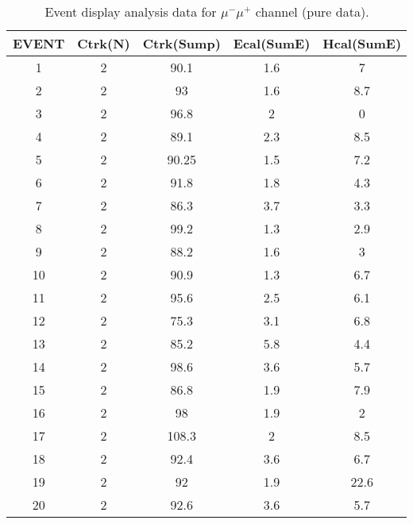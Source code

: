 \begin{table}[h!]
    \centering
    \caption{Event display analysis data for $\mu^-\mu^+$ channel (pure data).}
    \begin{tabular}{ccccc}
    \hline
    EVENT & Ctrk(N) & Ctrk(Sump) & Ecal(SumE) & Hcal(SumE) \\ \hline
    1     & 2       & 90.1       & 1.6        & 7          \\
    2     & 2       & 93         & 1.6        & 8.7        \\
    3     & 2       & 96.8       & 2          & 0          \\
    4     & 2       & 89.1       & 2.3        & 8.5        \\
    5     & 2       & 90.25      & 1.5        & 7.2        \\
    6     & 2       & 91.8       & 1.8        & 4.3        \\
    7     & 2       & 86.3       & 3.7        & 3.3        \\
    8     & 2       & 99.2       & 1.3        & 2.9        \\
    9     & 2       & 88.2       & 1.6        & 3          \\
    10    & 2       & 90.9       & 1.3        & 6.7        \\
    11    & 2       & 95.6       & 2.5        & 6.1        \\
    12    & 2       & 75.3       & 3.1        & 6.8        \\
    13    & 2       & 85.2       & 5.8        & 4.4        \\
    14    & 2       & 98.6       & 3.6        & 5.7        \\
    15    & 2       & 86.8       & 1.9        & 7.9        \\
    16    & 2       & 98         & 1.9        & 2          \\
    17    & 2       & 108.3      & 2          & 8.5        \\
    18    & 2       & 92.4       & 3.6        & 6.7        \\
    19    & 2       & 92         & 1.9        & 22.6       \\
    20    & 2       & 92.6       & 3.6        & 5.7       \\ \hline
    \end{tabular}
    \label{table:ed-mm}
\end{table}
    
